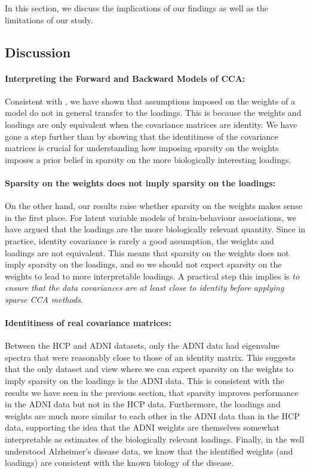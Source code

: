 In this section, we discuss the implications of our findings as well as the limitations of our study.

\subsection{Discussion}

\paragraph{Interpreting the Forward and Backward Models of CCA:} Consistent with \cite{haufe2014interpretation}, we have shown that assumptions imposed on the weights of a model do not in general transfer to the loadings.
This is because the weights and loadings are only equivalent when the covariance matrices are identity.
We have gone a step further than \cite{haufe2014interpretation} by showing that the identitiness of the covariance matrices is crucial for understanding how imposing sparsity on the weights imposes a prior belief in sparsity on the more biologically interesting loadings.

\paragraph{Sparsity on the weights does not imply sparsity on the loadings:}

On the other hand, our results raise whether sparsity on the weights makes sense in the first place.
For latent variable models of brain-behaviour associations, we have argued that the loadings are the more biologically relevant quantity.
Since in practice, identity covariance is rarely a good assumption, the weights and loadings are not equivalent.
This means that sparsity on the weights does not imply sparsity on the loadings, and so we should not expect sparsity on the weights to lead to more interpretable loadings.
A practical step this implies is \textit{to ensure that the data covariances are at least close to identity before applying sparse CCA methods}.

\paragraph{Identitiness of real covariance matrices:} Between the HCP and ADNI datasets, only the ADNI data had eigenvalue spectra that were reasonably close to those of an identity matrix.
This suggests that the only dataset and view where we can expect sparsity on the weights to imply sparsity on the loadings is the ADNI data.
This is consistent with the results we have seen in the previous section, that sparsity improves performance in the ADNI data but not in the HCP data.
Furthermore, the loadings and weights are much more similar to each other in the ADNI data than in the HCP data, supporting the idea that the ADNI weights are themselves somewhat interpretable as estimates of the biologically relevant loadings.
Finally, in the well understood Alzheimer's disease data, we know that the identified weights (and loadings) are consistent with the known biology of the disease.

